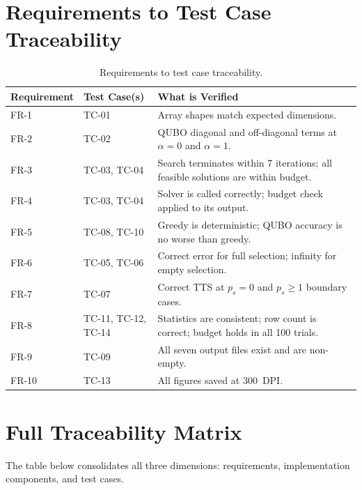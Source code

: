 \documentclass[12pt,a4paper]{article}
\begin{document}
\section{Requirements to Test Case Traceability}

\begin{table}[h!]
\centering
\renewcommand{\arraystretch}{1.4}
\begin{tabular}{@{}llp{7cm}@{}}
\toprule
\textbf{Requirement} & \textbf{Test Case(s)} & \textbf{What is Verified} \\
\midrule
FR-1  & TC-01 & Array shapes match expected dimensions. \\
FR-2  & TC-02 & QUBO diagonal and off-diagonal terms at $\alpha = 0$ and $\alpha = 1$. \\
FR-3  & TC-03, TC-04 & Search terminates within 7 iterations; all feasible solutions are within budget. \\
FR-4  & TC-03, TC-04 & Solver is called correctly; budget check applied to its output. \\
FR-5  & TC-08, TC-10 & Greedy is deterministic; QUBO accuracy is no worse than greedy. \\
FR-6  & TC-05, TC-06 & Correct error for full selection; infinity for empty selection. \\
FR-7  & TC-07 & Correct TTS at $p_s = 0$ and $p_s \geq 1$ boundary cases. \\
FR-8  & TC-11, TC-12, TC-14 & Statistics are consistent; row count is correct; budget holds in all 100 trials. \\
FR-9  & TC-09 & All seven output files exist and are non-empty. \\
FR-10 & TC-13 & All figures saved at 300~DPI. \\
\bottomrule
\end{tabular}
\caption{Requirements to test case traceability.}
\end{table}

\section{Full Traceability Matrix}

The table below consolidates all three dimensions: requirements,
implementation components, and test cases.
\end{document}
